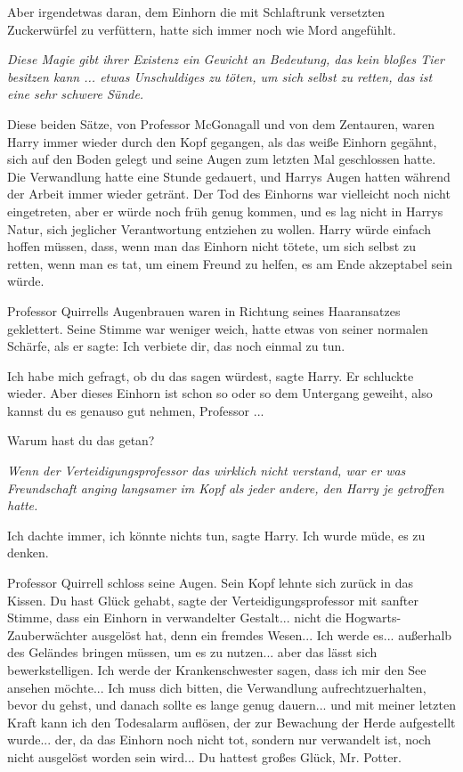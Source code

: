 Aber irgendetwas daran, dem Einhorn die mit Schlaftrunk versetzten Zuckerwürfel
zu verfüttern, hatte sich immer noch wie Mord angefühlt.

\emph{Diese Magie gibt ihrer Existenz ein Gewicht an Bedeutung, das kein bloßes
Tier besitzen kann ... etwas Unschuldiges zu töten, um sich selbst zu retten,
das ist eine sehr schwere Sünde.}

Diese beiden Sätze, von Professor McGonagall und von dem Zentauren, waren Harry
immer wieder durch den Kopf gegangen, als das weiße Einhorn gegähnt, sich auf
den Boden gelegt und seine Augen zum letzten Mal geschlossen hatte. Die
Verwandlung hatte eine Stunde gedauert, und Harrys Augen hatten während der
Arbeit immer wieder getränt. Der Tod des Einhorns war vielleicht noch nicht
eingetreten, aber er würde noch früh genug kommen, und es lag nicht in Harrys
Natur, sich jeglicher Verantwortung entziehen zu wollen. Harry würde einfach
hoffen müssen, dass, wenn man das Einhorn nicht tötete, um sich selbst zu
retten, wenn man es tat, um einem Freund zu helfen, es am Ende akzeptabel sein
würde.

Professor Quirrells Augenbrauen waren in Richtung seines Haaransatzes
geklettert. Seine Stimme war weniger weich, hatte etwas von seiner normalen
Schärfe, als er sagte: \glqq{}Ich verbiete dir, das noch einmal zu tun.\grqq{}

\glqq{}Ich habe mich gefragt, ob du das sagen würdest\grqq{}, sagte Harry. Er
schluckte wieder. \glqq{}Aber dieses Einhorn ist schon so oder so dem Untergang
geweiht, also kannst du es genauso gut nehmen, Professor ...\grqq{}

\glqq{}Warum hast du das getan?\grqq{}

\emph{Wenn der Verteidigungsprofessor das wirklich nicht verstand, war er was
Freundschaft anging langsamer im Kopf als jeder andere, den Harry je getroffen
hatte.}

\glqq{}Ich dachte immer, ich könnte nichts tun\grqq{}, sagte Harry. \glqq{}Ich
wurde müde, es zu denken.\grqq{}

Professor Quirrell schloss seine Augen. Sein Kopf lehnte sich zurück in das
Kissen. \glqq{}Du hast Glück gehabt\grqq{}, sagte der Verteidigungsprofessor mit
sanfter Stimme, \glqq{}dass ein Einhorn in verwandelter Gestalt... nicht die
Hogwarts-Zauberwächter ausgelöst hat, denn ein fremdes Wesen... Ich werde es...
außerhalb des Geländes bringen müssen, um es zu nutzen... aber das lässt sich
bewerkstelligen. Ich werde der Krankenschwester sagen, dass ich mir den See
ansehen möchte... Ich muss dich bitten, die Verwandlung aufrechtzuerhalten,
bevor du gehst, und danach sollte es lange genug dauern... und mit meiner
letzten Kraft kann ich den Todesalarm auflösen, der zur Bewachung der Herde
aufgestellt wurde... der, da das Einhorn noch nicht tot, sondern nur verwandelt
ist, noch nicht ausgelöst worden sein wird... Du hattest großes Glück, Mr.
Potter.\grqq{}

